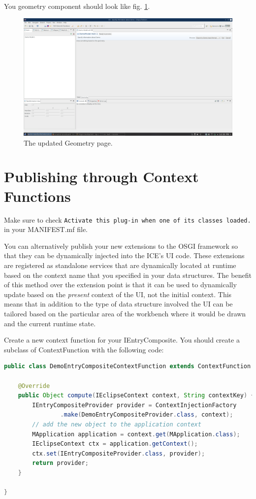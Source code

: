 You geometry component should look like fig. \ref{fig:iceDemoGeometryPage}.

\begin{figure}[h]
\includegraphics[width=\textwidth]{pics/dynamicUI_demoGeometryPage.png}
\caption{The updated Geometry page.}
\label{fig:iceDemoGeometryPage}
\end{figure}

\section{Publishing through Context Functions}

Make sure to check \texttt{Activate this plug-in when one of its classes
loaded.} in your MANIFEST.mf file.

You can alternatively publish your new extensions to the OSGI framework so that
they can be dynamically injected into the ICE's UI code. These extensions are
registered as standalone services that are dynamically located at runtime based
on the context name that you specified in your data structures. The benefit of
this method over the extension point is that it can be used to dynamically
update based on the \textit{present} context of the UI, not the initial
context. This means that in addition to the type of data structure involved the
UI can be tailored based on the particular area of the workbench where it would
be drawn and the current runtime state.

Create a new context function for your IEntryComposite. You should create a
subclass of ContextFunction with the following code:

\begin{lstlisting}[language=java]
public class DemoEntryCompositeContextFunction extends ContextFunction {

    @Override
    public Object compute(IEclipseContext context, String contextKey) {
        IEntryCompositeProvider provider = ContextInjectionFactory
                .make(DemoEntryCompositeProvider.class, context);
        // add the new object to the application context
        MApplication application = context.get(MApplication.class);
        IEclipseContext ctx = application.getContext();
        ctx.set(IEntryCompositeProvider.class, provider);
        return provider;
    }

}
\end{lstlisting}

